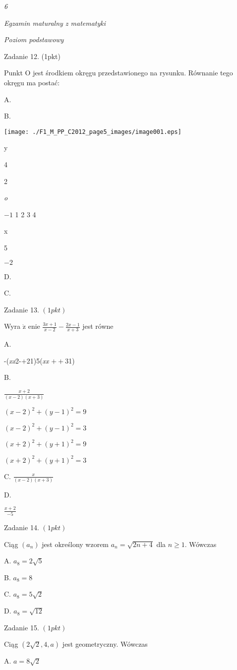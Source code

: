 \documentclass[a4paper,12pt]{article}
\begin{document}
{\it 6}

{\it Egzamin maturalny z matematyki}

{\it Poziom podstawowy}

Zadanie 12. (1pkt)

Punkt O jest środkiem okręgu przedstawionego na rysunku. Równanie tego okręgu ma postać:

A.

B.
\begin{center}
\texttt{[image: ./F1\_M\_PP\_C2012\_page5\_images/image001.eps]}
\end{center}
y

4

2

{\it o}

$-1$  1 2  3 4

x

5

$-2$

D.

C.

Zadanie 13. $(1pkt)$

Wyra $\dot{\mathrm{z}}$ enie $\displaystyle \frac{3x+1}{x-2}-\frac{2x-1}{x+3}$ jest równe

A.

-({\it xx}2-$+$21)5({\it xx} $++$31)

B.

$\displaystyle \frac{x+2}{(x-2)(x+3)}$

$(x-2)^{2}+(y-1)^{2}=9$

$(x-2)^{2}+(y-1)^{2}=3$

$(x+2)^{2}+(y+1)^{2}=9$

$(x+2)^{2}+(y+1)^{2}=3$

C. $\displaystyle \frac{x}{(x-2)(x+3)}$

D.

$\displaystyle \frac{x+2}{-5}$

Zadanie 14. $(1pkt)$

Ciąg $(a_{n})$ jest określony wzorem $a_{n}=\sqrt{2n+4}$ dla $n\geq 1$. Wówczas

A. $a_{8}=2\sqrt{5}$

B. $a_{8}=8$

C. $a_{8}=5\sqrt{2}$

D. $a_{8}=\sqrt{12}$

Zadanie 15. $(1pkt)$

Ciąg $(2\sqrt{2},4,a)$ jest geometryczny. Wówczas

A. $a=8\sqrt{2}$
\end{document}
